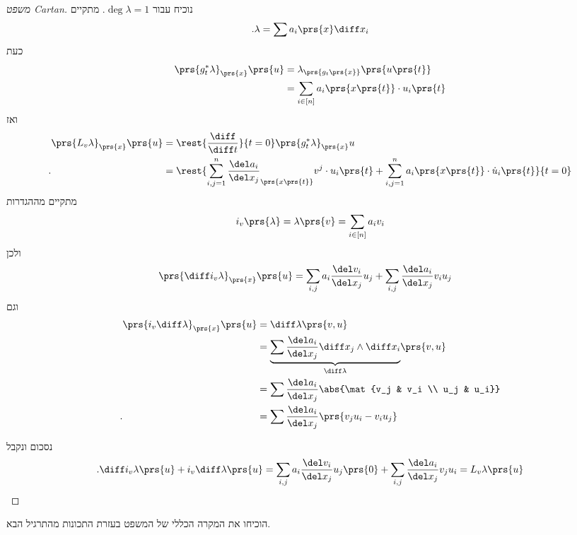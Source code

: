 \documentclass[a4paper,10pt,twoside,openany]{book}
\begin{document}
\begin{proof}[משפט \textenglish{Cartan}]
נוכיח עבור
$\deg \lambda = 1$.
מתקיים
\[\text{.} \lambda = \sum a_i \prs{x} \diff x_i\]
כעת
\begin{align*}
\prs{g_t^* \lambda}_{\prs{x}}\prs{u} &= \lambda_{\prs{g_t\prs{x}}}\prs{u\prs{t}} \\&=
\sum_{i\in[n]} a_i\prs{x\prs{t}} \cdot u_i\prs{t}
\end{align*}
ואז
\begin{align*}
\prs{L_v \lambda}_{\prs{x}} \prs{u} &= \rest{\frac{\diff}{\diff t}}{t=0} \prs{g_t^* \lambda}_{\prs{x}} u \\
\text{.} \phantom{\prs{L_v \lambda}_{\prs{x}} \prs{u}} &= \rest{\sum_{i,j=1}^n \frac{\del a_i}{\del x_j}_{\prs{x\prs{t}}} v^j \cdot u_i\prs{t} + \sum_{i,j = 1}^n a_i\prs{x\prs{t}} \cdot \dot{u}_{i} \prs{t}}{t=0}
\end{align*}
מתקיים מההגדרות
\[i_v\prs{\lambda} = \lambda\prs{v} = \sum_{i \in [n]} a_i v_i\]
ולכן
\begin{align*}
\prs{\diff i_v \lambda}_{\prs{x}} \prs{u} &= \sum_{i,j} a_i \frac{\del v_i}{\del x_j} u_j + \sum_{i,j}\frac{\del a_i}{\del x_j} v_i u_j
\end{align*}
וגם
\begin{align*}
\prs{i_v \diff \lambda}_{\prs{x}}\prs{u} &= \diff \lambda\prs{v,u} \\&= \underset{\diff \lambda}{\underbrace{ \sum \frac{\del a_i}{\del x_j} \diff x_j \wedge \diff x_i}} \prs{v,u} \\&= \sum \frac{\del a_i}{\del x_j} \abs{\mat{v_j & v_i \\ u_j & u_i}} \\ \text{.} \phantom{\prs{i_v \diff \lambda}_{\prs{x}}\prs{u}}&= \sum \frac{\del a_i}{\del x_j} \prs{v_j u_i - v_i u_j}
\end{align*}

נסכום ונקבל
\[\text{.} \diff i_v \lambda\prs{u} + i_v \diff \lambda\prs{u} = \sum_{i,j} a_i \frac{\del v_i}{\del x_j} u_j \prs{0} + \sum_{i,j} \frac{\del a_i}{\del x_j} v_j u_i = L_v \lambda\prs{u}\]
\end{proof}

\begin{exercise}
הוכיחו את המקרה הכללי של המשפט בעזרת התכונות מהתרגיל הבא.
\end{exercise}
\end{document}
